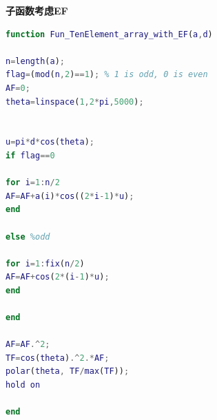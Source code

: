 \noindent \textbf{子函数考虑EF}
\begin{lstlisting}[language={matlab},keywordstyle=\color{blue!70},commentstyle=\color{red!50!green!50!blue!50},frame=shadowbox, rulesepcolor=\color{red!20!green!20!blue!20}]
function Fun_TenElement_array_with_EF(a,d)

n=length(a);
flag=(mod(n,2)==1); % 1 is odd, 0 is even
AF=0;
theta=linspace(1,2*pi,5000);


u=pi*d*cos(theta);
if flag==0

for i=1:n/2
AF=AF+a(i)*cos((2*i-1)*u);
end

else %odd

for i=1:fix(n/2)
AF=AF+cos(2*(i-1)*u);
end

end

AF=AF.^2;
TF=cos(theta).^2.*AF;
polar(theta, TF/max(TF));
hold on 

end
\end{lstlisting}